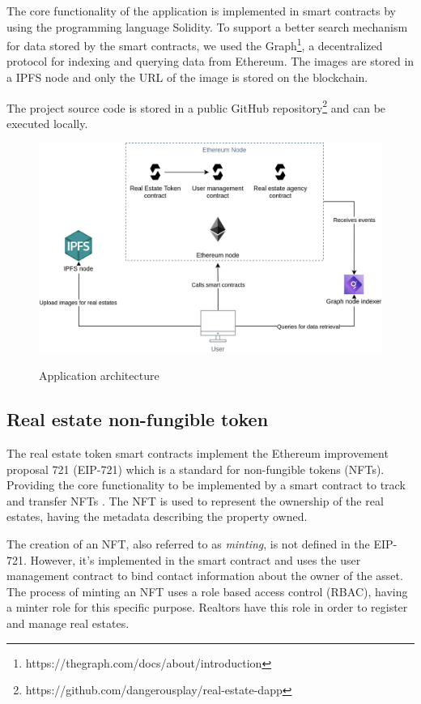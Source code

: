 \documentclass[
    article, 
    12pt,				%
	oneside,			%
	a4paper,			%
	chapter=TITLE,		%
	section=TITLE,		%
	english,			%
	english,				%
	sumario=tradicional
]{abntex2}
\begin{document}
The core functionality of the application is implemented in smart contracts by using the programming language Solidity. 
To support a better search mechanism for data stored by the smart contracts, we used the Graph\footnote{https://thegraph.com/docs/about/introduction}, a decentralized protocol for indexing and querying data from Ethereum.
The images are stored in a IPFS node and only the URL of the image is stored on the blockchain.

The project source code is stored in a public GitHub repository\footnote{https://github.com/dangerousplay/real-estate-dapp} and can be executed locally.


\begin{figure}[ht]
    \centering
    \caption{Application architecture}
    \includegraphics[width=\textwidth]{images/Real_Estate_arch.png}
    \label{fig:application_architecture}
\end{figure}


\subsection{Real estate non-fungible token}

The real estate token smart contracts implement the Ethereum improvement proposal 721 (EIP-721) which is a standard for non-fungible tokens (NFTs).
Providing the core functionality to be implemented by a smart contract to track and transfer NFTs \cite{eip_721_2018}.
The NFT is used to represent the ownership of the real estates, having the metadata describing the property owned.

The creation of an NFT, also referred to as \textit{minting}, is not defined in the EIP-721. 
However, it's implemented in the smart contract and uses the user management contract to bind contact information about the owner of the asset.
The process of minting an NFT uses a role based access control (RBAC), having a minter role for this specific purpose.
Realtors have this role in order to register and manage real estates. 
\end{document}
